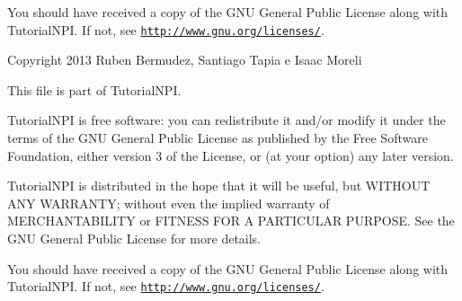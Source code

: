 You should have received a copy of the G\-N\-U General Public License along with Tutorial\-N\-P\-I. If not, see \href{http://www.gnu.org/licenses/}{\tt http\-://www.\-gnu.\-org/licenses/}.

Copyright 2013 Ruben Bermudez, Santiago Tapia e Isaac Moreli

This file is part of Tutorial\-N\-P\-I.

Tutorial\-N\-P\-I is free software\-: you can redistribute it and/or modify it under the terms of the G\-N\-U General Public License as published by the Free Software Foundation, either version 3 of the License, or (at your option) any later version.

Tutorial\-N\-P\-I is distributed in the hope that it will be useful, but W\-I\-T\-H\-O\-U\-T A\-N\-Y W\-A\-R\-R\-A\-N\-T\-Y; without even the implied warranty of M\-E\-R\-C\-H\-A\-N\-T\-A\-B\-I\-L\-I\-T\-Y or F\-I\-T\-N\-E\-S\-S F\-O\-R A P\-A\-R\-T\-I\-C\-U\-L\-A\-R P\-U\-R\-P\-O\-S\-E. See the G\-N\-U General Public License for more details.

You should have received a copy of the G\-N\-U General Public License along with Tutorial\-N\-P\-I. If not, see \href{http://www.gnu.org/licenses/}{\tt http\-://www.\-gnu.\-org/licenses/}. 